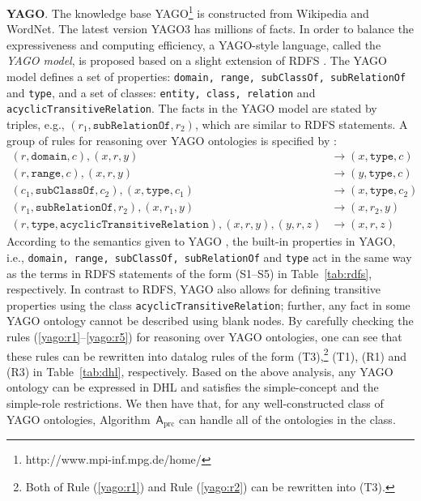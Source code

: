 \textbf{YAGO}. The knowledge base YAGO\footnote{http://www.mpi-inf.mpg.de/home/}
is constructed from Wikipedia and WordNet. The latest version
YAGO3 \cite{MahdisoltaniBS15} has millions of facts.
In order to balance the expressiveness and computing efficiency,
a YAGO-style language, called the \emph{YAGO model}, is proposed based on
a slight extension of RDFS \cite{SuchanekKW08}. The YAGO model defines
a set of properties: \texttt{domain, range, subClassOf, subRelationOf} and \texttt{type},
and a set of classes: \texttt{entity, class, relation} and \texttt{acyclicTransitiveRelation}.
The facts in the YAGO model are stated by triples, e.g., $(r_1,
\texttt{subRelationOf}, r_2)$,
which are similar to RDFS statements.
A group of rules for reasoning over YAGO ontologies
is specified by \citet{SuchanekKW08}:
\begin{align}
(r,\texttt{domain}, c), (x, r, y) & \rightarrow (x,
    \texttt{type}, c)\label{yago:r1}\\
(r,\texttt{range}, c), (x, r, y) & \rightarrow (y,
    \texttt{type}, c)\label{yago:r2}\\
(c_1, \texttt{subClassOf}, c_2), (x, \texttt{type}, c_1)
    & \rightarrow (x, \texttt{type}, c_2)\label{yago:r3}\\
(r_1, \texttt{subRelationOf}, r_2), (x, r_1, y) & \rightarrow
    (x, r_2, y)\label{yago:r4}\\
(r, \texttt{type}, \texttt{acyclicTransitiveRelation}), (x,
    r, y), (y, r, z) & \rightarrow (x, r, z)\label{yago:r5}
\end{align}
According to the semantics given to YAGO \cite{SuchanekKW08}, the built-in properties in YAGO,
i.e., \texttt{domain, range, subClassOf, subRelationOf} and \texttt{type} act in the same
way as the terms in RDFS statements of the form (S1--S5) in Table~\ref{tab:rdfs}, respectively.
In contrast to RDFS, YAGO also allows for defining
transitive properties using the
class \texttt{acyclicTransitiveRelation}; further, any fact in some YAGO ontology cannot be
described using blank nodes. By carefully checking the rules (\ref{yago:r1}--\ref{yago:r5}) for reasoning over YAGO ontologies,
one can see that these rules can be rewritten into datalog rules
of the form (T3),\footnote{Both of Rule (\ref{yago:r1}) and
Rule (\ref{yago:r2}) can be rewritten into (T3).} (T1), (R1) and (R3) in Table~\ref{tab:dhl}, respectively.
Based on the above analysis, any YAGO ontology can be expressed in DHL
and satisfies the simple-concept and the simple-role restrictions. We then have that,
for any well-constructed class of YAGO ontologies,
Algorithm~$\mathsf{A}_{\text{prc}}$
can handle all of the ontologies in the class.

